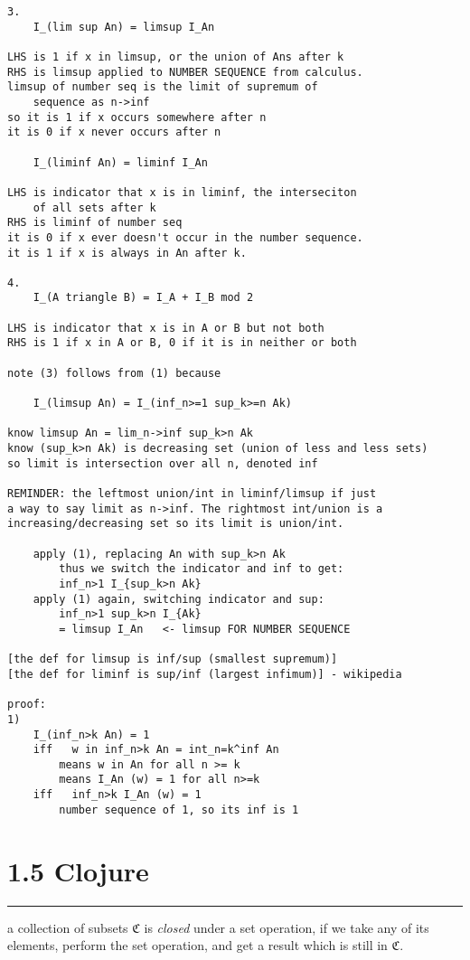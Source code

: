 \documentclass{article}
\begin{document}
\begin{flushleft}
\begin{verbatim}
3. 
    I_(lim sup An) = limsup I_An

LHS is 1 if x in limsup, or the union of Ans after k 
RHS is limsup applied to NUMBER SEQUENCE from calculus.
limsup of number seq is the limit of supremum of 
    sequence as n->inf 
so it is 1 if x occurs somewhere after n
it is 0 if x never occurs after n

    I_(liminf An) = liminf I_An

LHS is indicator that x is in liminf, the interseciton 
    of all sets after k
RHS is liminf of number seq
it is 0 if x ever doesn't occur in the number sequence.
it is 1 if x is always in An after k.

4. 
    I_(A triangle B) = I_A + I_B mod 2

LHS is indicator that x is in A or B but not both
RHS is 1 if x in A or B, 0 if it is in neither or both

note (3) follows from (1) because 

    I_(limsup An) = I_(inf_n>=1 sup_k>=n Ak)

know limsup An = lim_n->inf sup_k>n Ak
know (sup_k>n Ak) is decreasing set (union of less and less sets)
so limit is intersection over all n, denoted inf 

REMINDER: the leftmost union/int in liminf/limsup if just 
a way to say limit as n->inf. The rightmost int/union is a
increasing/decreasing set so its limit is union/int.

    apply (1), replacing An with sup_k>n Ak
        thus we switch the indicator and inf to get:
        inf_n>1 I_{sup_k>n Ak}
    apply (1) again, switching indicator and sup:
        inf_n>1 sup_k>n I_{Ak}
        = limsup I_An   <- limsup FOR NUMBER SEQUENCE

[the def for limsup is inf/sup (smallest supremum)]
[the def for liminf is sup/inf (largest infimum)] - wikipedia

proof:
1) 
    I_(inf_n>k An) = 1   
    iff   w in inf_n>k An = int_n=k^inf An
        means w in An for all n >= k
        means I_An (w) = 1 for all n>=k
    iff   inf_n>k I_An (w) = 1     
        number sequence of 1, so its inf is 1

\end{verbatim}


\section*{1.5 Clojure}
\bigbreak
\hrule
\bigbreak

a collection of subsets $\mathfrak{C}$ is \emph{closed} under a set operation, if we take any of its elements, perform the set operation, and get a result which is still in $\mathfrak{C}$.


\end{flushleft}
\end{document}
